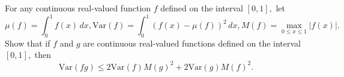 For any continuous real-valued function $f$ defined on the interval $[0,1],$ let \[\mu(f)=\int_0^1f(x)\,dx,\text{Var}(f)=\int_0^1(f(x)-\mu(f))^2\,dx, M(f)=\max_{0\le x\le 1}|f(x)|.\] Show that if $f$ and $g$ are continuous real-valued functions defined on the interval $[0,1],$ then \[\text{Var}(fg)\le 2\text{Var}(f)M(g)^2+2\text{Var}(g)M(f)^2.\]
